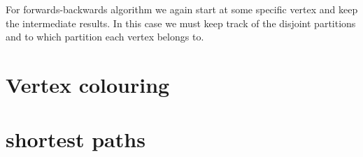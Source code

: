 \documentclass{report}
\theoremstyle{plain}
\theoremstyle{definition}
\theoremstyle{remark}
\numberwithin{definition}{chapter}
\numberwithin{example}{chapter}
\numberwithin{figure}{chapter}
\numberwithin{theorem}{chapter}
\numberwithin{lemma}{chapter}
\begin{document}
For forwards-backwards algorithm we again start at some specific vertex and keep the intermediate results. In this case we must keep track of the disjoint partitions and to which partition each vertex belongs to.

\chapter{Vertex colouring}

\chapter{shortest paths}



\end{document}

